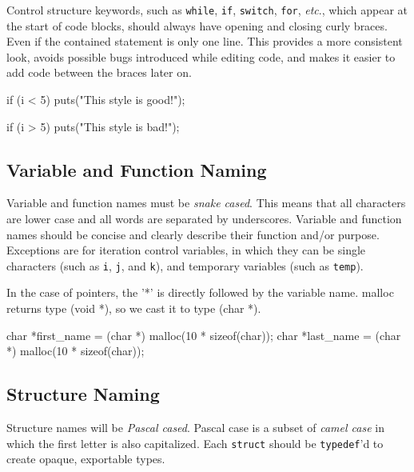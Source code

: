 \documentclass[11pt]{article}
\begin{document}
Control structure keywords, such as \texttt{while}, \texttt{if},
\texttt{switch}, \texttt{for}, \emph{etc}., which appear at the start of code
blocks, should always have opening and closing curly braces. Even if the
contained statement is only one line. This provides a more consistent look,
avoids possible bugs introduced while editing code, and makes it easier to add
code between the braces later on.

\begin{codelisting}{}
if (i < 5) {
    puts("This style is good!");
}

if (i > 5)
    puts("This style is bad!");
\end{codelisting}


\subsection{Variable and Function Naming}

Variable and function names must be \emph{snake cased}. This means that all
characters are lower case and all words are separated by underscores.  Variable
and function names should be concise and clearly describe their function and/or
purpose. Exceptions are for iteration control variables, in which they can be
single characters (such as \texttt{i}, \texttt{j}, and \texttt{k}), and
temporary variables (such as \texttt{temp}).


In the case of pointers, the '*' is directly followed by the variable name.
malloc returns type (void *), so we cast it to type (char *).

\begin{codelisting}{}
char *first_name = (char *) malloc(10 * sizeof(char));
char *last_name = (char *) malloc(10 * sizeof(char));
\end{codelisting}


\subsection{Structure Naming}

Structure names will be \emph{Pascal cased}. Pascal case is a subset of \emph{camel
case} in which the first letter is also capitalized. Each \texttt{struct} should
be \texttt{typedef}'d to create opaque, exportable types.
\end{document}
